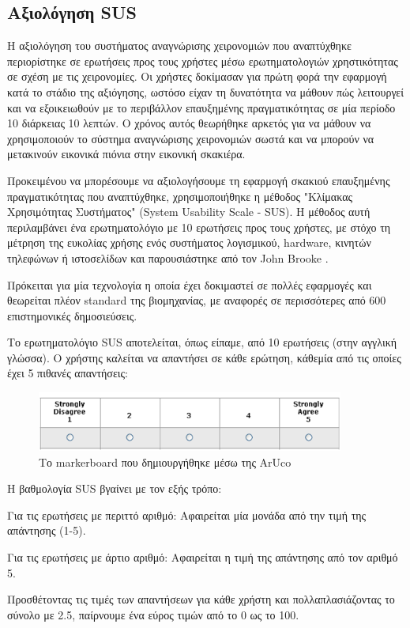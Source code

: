 \subsection{Αξιολόγηση SUS}



Η αξιολόγηση του συστήματος αναγνώρισης χειρονομιών που αναπτύχθηκε περιορίστηκε σε ερωτήσεις προς τους χρήστες μέσω ερωτηματολογιών χρηστικότητας σε σχέση με τις χειρονομίες. Οι χρήστες δοκίμασαν για πρώτη φορά την εφαρμογή κατά το στάδιο της αξιόγησης, ωστόσο είχαν τη δυνατότητα να μάθουν πώς λειτουργεί και να εξοικειωθούν με το περιβάλλον επαυξημένης πραγματικότητας σε μία περίοδο 10 διάρκειας 10 λεπτών. Ο χρόνος αυτός θεωρήθηκε αρκετός για να μάθουν να χρησιμοποιούν το σύστημα αναγνώρισης χειρονομιών σωστά και να μπορούν να μετακινούν εικονικά πιόνια στην εικονική σκακιέρα. 


Προκειμένου να μπορέσουμε να αξιολογήσουμε τη εφαρμογή σκακιού επαυξημένης πραγματικότητας που αναπτύχθηκε, χρησιμοποιήθηκε η μέθοδος "Κλίμακας Χρησιμότητας Συστήματος" (System Usability Scale - SUS). Η μέθοδος αυτή περιλαμβάνει ένα ερωτηματολόγιο με 10 ερωτήσεις προς τους χρήστες, με στόχο τη μέτρηση της ευκολίας χρήσης ενός συστήματος λογισμικού, hardware, κινητών τηλεφώνων ή ιστοσελίδων και παρουσιάστηκε από τον John Brooke \cite{Brooke1996}.

Πρόκειται για μία τεχνολογία η οποία έχει δοκιμαστεί σε πολλές εφαρμογές και θεωρείται πλέον standard της βιομηχανίας, με αναφορές σε περισσότερες από 600 επιστημονικές δημοσιεύσεις. 


Το ερωτηματολόγιο SUS αποτελείται, όπως είπαμε, από 10 ερωτήσεις (στην αγγλική γλώσσα). Ο χρήστης καλείται να απαντήσει σε κάθε ερώτηση, κάθεμία από τις οποίες έχει 5 πιθανές απαντήσεις:


\begin{figure}[H]
    \centering
    \includegraphics[width=0.9\textwidth]{Files/Figures/sus-responses.png}
    \caption[Το markerboard που δημιουργήθηκε μέσω της ArUco]{Το markerboard που δημιουργήθηκε μέσω της ArUco}
    \label{fig:markerboard}
\end{figure}




Η βαθμολογία SUS βγαίνει με τον εξής τρόπο:
\begin{description}
\item Για τις ερωτήσεις με περιττό αριθμό: Αφαιρείται μία μονάδα από την τιμή της απάντησης (1-5).
\item Για τις ερωτήσεις με άρτιο αριθμό: Αφαιρείται η τιμή της απάντησης από τον αριθμό 5.
\item  Προσθέτοντας τις τιμές των απαντήσεων για κάθε χρήστη και πολλαπλασιάζοντας το σύνολο με 2.5, παίρνουμε ένα εύρος τιμών από το 0 ως το 100.
\end{description}





